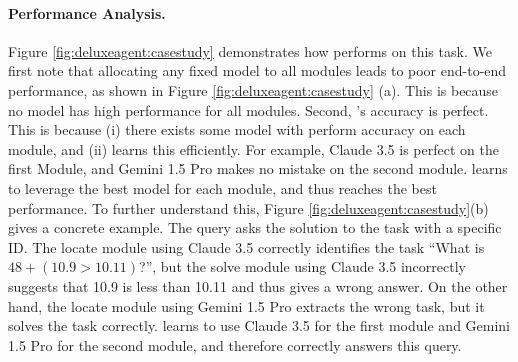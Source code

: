 \paragraph{Performance Analysis.} Figure \ref{fig:deluxeagent:casestudy} demonstrates how \deluxesystem{} performs on this task. We first note that allocating any fixed model to all modules leads to poor end-to-end performance, as shown in Figure \ref{fig:deluxeagent:casestudy} (a). This is because no model has high performance for all modules. Second, \deluxesystem{}'s accuracy is perfect. This is because (i) there exists some model with perform accuracy on each module, and (ii) \deluxesystem{} learns this efficiently. For example, Claude 3.5 is perfect on the first Module, and Gemini 1.5 Pro makes no mistake on the second module. 
\deluxesystem{} learns to leverage the best model for each module, and thus reaches the best performance. 
To further understand this, Figure \ref{fig:deluxeagent:casestudy}(b) gives a concrete example. The query asks the solution to the task with a specific ID. The locate module using Claude 3.5 correctly identifies the task ``What is $48+ (10.9>10.11)$?'', but the solve module using Claude 3.5 incorrectly suggests that 10.9 is less than 10.11 and thus gives a wrong answer. 
On the other hand, the locate module using Gemini 1.5 Pro extracts the wrong task, but it solves the task correctly. \deluxesystem{} learns to use Claude 3.5 for the first module and Gemini 1.5 Pro for the second module, and therefore correctly answers this query. 


 

